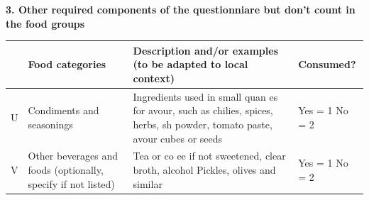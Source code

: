 \documentclass[12pt,]{book}
\theoremstyle{definition}
\theoremstyle{definition}
\theoremstyle{definition}
\theoremstyle{remark}
\begin{document}
\textbf{3. Other required components of the questionniare but don't
count in the food groups}

\begin{longtable}[]{@{}clll@{}}
\toprule
\begin{minipage}[b]{0.05\columnwidth}\centering
\strut
\end{minipage} & \begin{minipage}[b]{0.18\columnwidth}\raggedright
\textbf{Food categories}\strut
\end{minipage} & \begin{minipage}[b]{0.54\columnwidth}\raggedright
\textbf{Description and/or examples (to be adapted to local
context)}\strut
\end{minipage} & \begin{minipage}[b]{0.12\columnwidth}\raggedright
\textbf{Consumed?}\strut
\end{minipage}\tabularnewline
\midrule
\endhead
\begin{minipage}[t]{0.05\columnwidth}\centering
U\strut
\end{minipage} & \begin{minipage}[t]{0.18\columnwidth}\raggedright
Condiments and seasonings\strut
\end{minipage} & \begin{minipage}[t]{0.54\columnwidth}\raggedright
Ingredients used in small quan es for avour, such as chilies, spices,
herbs, sh powder, tomato paste, avour cubes or seeds\strut
\end{minipage} & \begin{minipage}[t]{0.12\columnwidth}\raggedright
Yes = 1 No = 2\strut
\end{minipage}\tabularnewline
\begin{minipage}[t]{0.05\columnwidth}\centering
V\strut
\end{minipage} & \begin{minipage}[t]{0.18\columnwidth}\raggedright
Other beverages and foods (optionally, specify if not listed)\strut
\end{minipage} & \begin{minipage}[t]{0.54\columnwidth}\raggedright
Tea or co ee if not sweetened, clear broth, alcohol Pickles, olives and
similar\strut
\end{minipage} & \begin{minipage}[t]{0.12\columnwidth}\raggedright
Yes = 1 No = 2\strut
\end{minipage}\tabularnewline
\bottomrule
\end{longtable}
\end{document}
